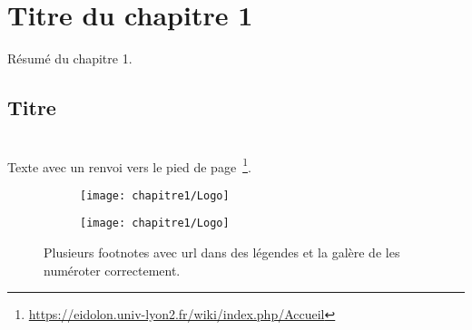 \chapter{Titre du chapitre 1}
\label{chap1}
\begin{justify}
Résumé du chapitre 1.
\end{justify}
\adjustmtc  %
\minitoc
\newpage

\section{Titre}
\lipsum[1-3]
%
\\
\indent Texte avec un renvoi vers le pied de page~\footnote{\url{https://eidolon.univ-lyon2.fr/wiki/index.php/Accueil}}.

\begin{figure}[h]
\centering
	\begin{subfigure}[t]{0.4\textwidth}
		\centering
		\texttt{[image: chapitre1/Logo]}
	\end{subfigure}
	\hfill
	\begin{subfigure}[t]{0.4\textwidth}
		\centering
		\texttt{[image: chapitre1/Logo]}
	\end{subfigure}
\caption{Plusieurs footnotes avec url dans des légendes et la galère de les numéroter correctement.}
\end{figure}
\addtocounter{footnote}{-1}  %
